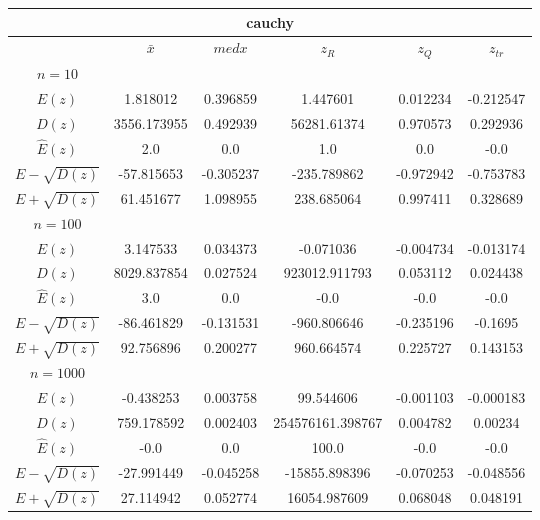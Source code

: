 \begin{tabular}{|c | c | c | c | c | c|} 
 \hline \multicolumn{6}{|c|}{cauchy} \\ 
 \hline & $\bar{x}$ & $medx$ & $z_R$ & $z_Q$ & $z_{tr}$ 
 \\ \hline $n=10$ & & & & & \\ 
 \hline $E(z)$ 
 &1.818012 &0.396859 &1.447601 &0.012234 &-0.212547 \\ 
 \hline $D(z)$ 
 &3556.173955 &0.492939 &56281.61374 &0.970573 &0.292936 \\ 
\hline $\hat{E}(z)$ 
&2.0&0.0&1.0&0.0&-0.0 \\ 
\hline $E-\sqrt{D(z)}$ 
&-57.815653&-0.305237&-235.789862&-0.972942&-0.753783 \\ 
\hline $E+\sqrt{D(z)}$ 
&61.451677&1.098955&238.685064&0.997411&0.328689 \\ \hline $n=100$ & & & & & \\ 
 \hline $E(z)$ 
 &3.147533 &0.034373 &-0.071036 &-0.004734 &-0.013174 \\ 
 \hline $D(z)$ 
 &8029.837854 &0.027524 &923012.911793 &0.053112 &0.024438 \\ 
\hline $\hat{E}(z)$ 
&3.0&0.0&-0.0&-0.0&-0.0 \\ 
\hline $E-\sqrt{D(z)}$ 
&-86.461829&-0.131531&-960.806646&-0.235196&-0.1695 \\ 
\hline $E+\sqrt{D(z)}$ 
&92.756896&0.200277&960.664574&0.225727&0.143153 \\ \hline $n=1000$ & & & & & \\ 
 \hline $E(z)$ 
 &-0.438253 &0.003758 &99.544606 &-0.001103 &-0.000183 \\ 
 \hline $D(z)$ 
 &759.178592 &0.002403 &254576161.398767 &0.004782 &0.00234 \\ 
\hline $\hat{E}(z)$ 
&-0.0&0.0&100.0&-0.0&-0.0 \\ 
\hline $E-\sqrt{D(z)}$ 
&-27.991449&-0.045258&-15855.898396&-0.070253&-0.048556 \\ 
\hline $E+\sqrt{D(z)}$ 
&27.114942&0.052774&16054.987609&0.068048&0.048191 \\ \hline 
 \end{tabular}